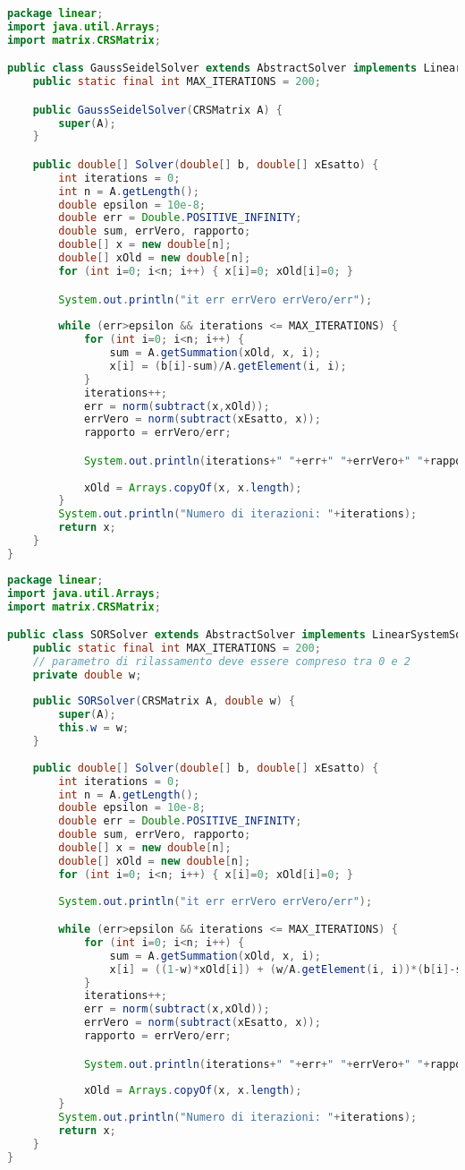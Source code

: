 \documentclass[12pt]{article}
\begin{document}
\begin{lstlisting}[language=Java]
package linear;
import java.util.Arrays;
import matrix.CRSMatrix;

public class GaussSeidelSolver extends AbstractSolver implements LinearSystemSolver {
	public static final int MAX_ITERATIONS = 200;

	public GaussSeidelSolver(CRSMatrix A) {				
		super(A);
	}

	public double[] Solver(double[] b, double[] xEsatto) {
		int iterations = 0;
		int n = A.getLength();
		double epsilon = 10e-8;
		double err = Double.POSITIVE_INFINITY;
		double sum, errVero, rapporto;
		double[] x = new double[n];
		double[] xOld = new double[n];
		for (int i=0; i<n; i++) { x[i]=0; xOld[i]=0; }

		System.out.println("it err errVero errVero/err");
		
		while (err>epsilon && iterations <= MAX_ITERATIONS) {
			for (int i=0; i<n; i++) {
				sum = A.getSummation(xOld, x, i);
				x[i] = (b[i]-sum)/A.getElement(i, i);
			}
			iterations++;
			err = norm(subtract(x,xOld));
			errVero = norm(subtract(xEsatto, x));
			rapporto = errVero/err;

			System.out.println(iterations+" "+err+" "+errVero+" "+rapporto);
			
			xOld = Arrays.copyOf(x, x.length);
		}
		System.out.println("Numero di iterazioni: "+iterations);
		return x;
	}
}
\end{lstlisting}
\begin{lstlisting}[language=Java]
package linear;
import java.util.Arrays;
import matrix.CRSMatrix;

public class SORSolver extends AbstractSolver implements LinearSystemSolver {
	public static final int MAX_ITERATIONS = 200;
	// parametro di rilassamento deve essere compreso tra 0 e 2
	private double w;
	
	public SORSolver(CRSMatrix A, double w) {
		super(A);
		this.w = w;
	}
		
	public double[] Solver(double[] b, double[] xEsatto) {
		int iterations = 0;
		int n = A.getLength();
		double epsilon = 10e-8;
		double err = Double.POSITIVE_INFINITY;
		double sum, errVero, rapporto;
		double[] x = new double[n];
		double[] xOld = new double[n];
		for (int i=0; i<n; i++) { x[i]=0; xOld[i]=0; }
		
		System.out.println("it err errVero errVero/err");

		while (err>epsilon && iterations <= MAX_ITERATIONS) {	
			for (int i=0; i<n; i++) {
				sum = A.getSummation(xOld, x, i);
				x[i] = ((1-w)*xOld[i]) + (w/A.getElement(i, i))*(b[i]-sum);
			}
			iterations++;
			err = norm(subtract(x,xOld));
			errVero = norm(subtract(xEsatto, x));
			rapporto = errVero/err;

			System.out.println(iterations+" "+err+" "+errVero+" "+rapporto);
			
			xOld = Arrays.copyOf(x, x.length);
		}
		System.out.println("Numero di iterazioni: "+iterations);
		return x;
	}
}
\end{lstlisting}
\end{document}
